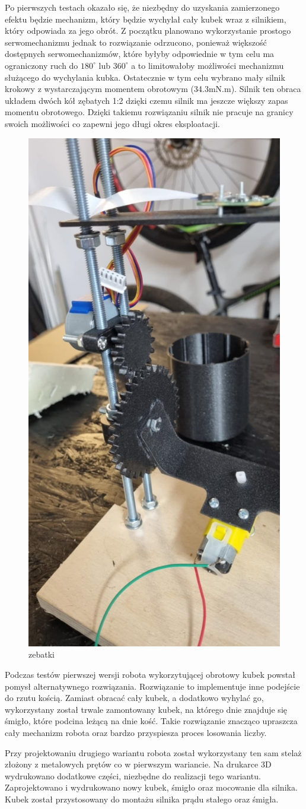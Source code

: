 Po pierwszych testach okazało się, że niezbędny do uzyskania zamierzonego efektu będzie mechanizm, który będzie 
wychylał cały kubek wraz z silnikiem, który odpowiada za jego obrót. Z początku planowano wykorzystanie prostogo
serwomechanizmu jednak to rozwiązanie odrzucono, ponieważ większość dostępnych serwomechanizmów, które byłyby odpowiednie w tym celu ma
ograniczony ruch do $180^{\circ}$ lub $360^{\circ}$ a to limitowałoby możliwości mechanizmu służącego do wychylania kubka.
Ostatecznie w tym celu wybrano mały silnik krokowy z wystarczającym momentem obrotowym (34.3mN.m). Silnik ten obraca 
układem dwóch kół zębatych 1:2 dzięki czemu silnik ma jeszcze większy zapas momentu obrotowego. Dzięki takiemu rozwiązaniu silnik
nie pracuje na granicy swoich możliwości co zapewni jego długi okres eksploatacji. 

\begin{figure}[H]
    \centering
    \includegraphics[width=0.25\linewidth]{chapters/03-praca-wlasna/figures/koła_zębowe.png}
    \caption{\label{fig:zebatki}zebatki}
\end{figure}

Podczas testów pierwszej wersji robota wykorzytującej obrotowy kubek powstał pomysł alternatywnego rozwiązania.
Rozwiązanie to implementuje inne podejście do rzutu kością. Zamiast obracać cały kubek, a dodatkowo wyhylać go,
wykorzystany został trwale zamontowany kubek, na którego dnie znajduje się śmigło, które podcina leżącą na dnie kość.
Takie rozwiązanie znacząco upraszcza cały mechanizm robota oraz bardzo przyspiesza proces losowania liczby.

Przy projektowaniu drugiego wariantu robota został wykorzystany ten sam stelaż złożony z metalowych prętów co w 
pierwszym wariancie. Na drukarce 3D wydrukowano dodatkowe części, niezbędne do realizacji tego wariantu.
Zaprojektowano i wydrukowano nowy kubek, śmigło oraz mocowanie dla silnika. Kubek został przystosowany do montażu 
silnika prądu stałego oraz śmigła. 

